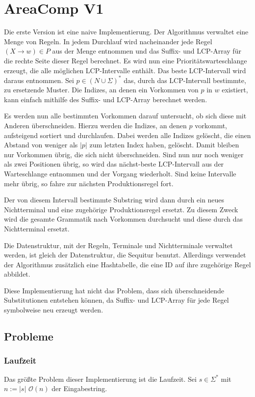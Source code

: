 \section{AreaComp V1}

Die erste Version ist eine naive Implementierung. Der Algorithmus verwaltet eine Menge von Regeln. In jedem Durchlauf wird nacheinander jede Regel $(X \rightarrow w) \in P$ aus der Menge entnommen und das Suffix- und LCP-Array für die rechte Seite dieser Regel berechnet. Es wird nun eine Prioritätswarteschlange erzeugt, die alle möglichen LCP-Intervalle enthält. Das beste LCP-Intervall wird daraus entnommen. Sei $p \in (N \cup \Sigma)^*$ das, durch das LCP-Intervall bestimmte, zu ersetzende Muster. Die Indizes, an denen ein Vorkommen von $p$ in $w$ existiert, kann einfach mithilfe des Suffix- und LCP-Array berechnet werden.

Es werden nun alle bestimmten Vorkommen darauf untersucht, ob sich diese mit Anderen überschneiden. Hierzu werden die Indizes, an denen $p$ vorkommt, aufsteigend sortiert und durchlaufen. Dabei werden alle Indizes gelöscht, die einen Abstand von weniger als $|p|$ zum letzten Index haben, gelöscht. Damit bleiben nur Vorkommen übrig, die sich nicht überschneiden. Sind nun nur noch weniger als zwei Positionen übrig, so wird das nächst-beste LCP-Intervall aus der Warteschlange entnommen und der Vorgang wiederholt. Sind keine Intervalle mehr übrig, so fahre zur nächsten Produktionsregel fort.

Der von diesem Intervall bestimmte Substring wird dann durch ein neues Nichtterminal und eine zugehörige Produktionsregel ersetzt. Zu diesem Zweck wird die gesamte Grammatik nach Vorkommen durchsucht und diese durch das Nichtterminal ersetzt.

Die Datenstruktur, mit der Regeln, Terminale und Nichtterminale verwaltet werden, ist gleich der Datenstruktur, die Sequitur benutzt. Allerdings verwendet der Algorithmus zusätzlich eine Hashtabelle, die eine ID auf ihre zugehörige Regel abbildet.

Diese Implementierung hat nicht das Problem, dass sich überschneidende Substitutionen entstehen können, da Suffix- und LCP-Array für jede Regel symbolweise neu erzeugt werden. 

\subsection{Probleme}

\subsubsection{Laufzeit}
Das größte Problem dieser Implementierung ist die Laufzeit. Sei $s \in \Sigma^*$ mit $n := |s|$ $\mathcal{O}(n)$ der Eingabestring.

